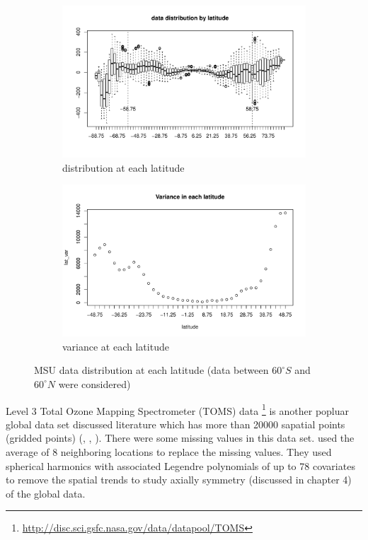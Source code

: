 \begin{figure}[H]
	\begin{subfigure}{.5\textwidth}
		\centering
		\includegraphics[width=1\linewidth]{graphs//MSU_data_latitude}
		\caption{distribution at each latitude}
		\label{MSU_data_latitude}
	\end{subfigure}
	\begin{subfigure}{.5\textwidth}
		\centering
		\includegraphics[width=1\linewidth]{graphs/MSU_data_var_lat}
		\caption{variance at each latitude}
		\label{MSU_data_var_lat}
	\end{subfigure}
	\caption[MSU data distribution at each latitude (data between $60^\circ S$ and $60^\circ N$ were considered)]{MSU data distribution at each latitude (data between $60^\circ S$ and $60^\circ N$ were considered)}
	\label{compare_varigram_sim_2}
\end{figure}


Level 3 Total Ozone Mapping Spectrometer (TOMS) data \footnote{\url{http://disc.sci.gsfc.nasa.gov/data/datapool/TOMS}} is another popluar global data set discussed literature which has more than 20000 sapatial points (gridded points) (\cite{Stein2007}, \cite{CressieJohannesson2008}, \cite{JunStein2008}). There were some missing values in this data set. \cite{Stein2007} used the average of 8 neighboring locations to replace the missing values. They used spherical harmonics with associated Legendre polynomials of up to 78 covariates to remove the spatial trends to study axially symmetry (discussed in chapter 4) of the global data. 

